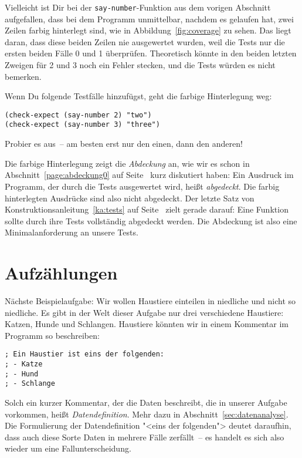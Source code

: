 Vielleicht ist Dir bei der \lstinline{say-number}-Funktion aus dem
vorigen Abschnitt aufgefallen, dass bei dem Programm unmittelbar, nachdem
es gelaufen hat, zwei Zeilen farbig
hinterlegt sind, wie in Abbildung~\ref{fig:coverage} zu sehen.  Das liegt
daran, dass diese beiden Zeilen nie ausgewertet wurden, weil die
Tests nur die ersten beiden Fälle 0 und 1 überprüfen.  Theoretisch
könnte in den beiden letzten Zweigen für 2 und 3 noch ein Fehler
stecken, und die Tests würden es nicht bemerken.

Wenn Du folgende Testfälle hinzufügst, geht die farbige Hinterlegung weg:
%
\begin{lstlisting}
(check-expect (say-number 2) "two")
(check-expect (say-number 3) "three")
\end{lstlisting}
%
Probier es aus~-- am besten erst nur den einen, dann den anderen!

Die farbige Hinterlegung zeigt die \textit{Abdeckung} an, wie wir es
schon in Abschnitt~\ref{page:abdeckung0} auf
Seite~\pageref{page:abdeckung0} kurz diskutiert haben: Ein Ausdruck im
Programm, der durch die Tests ausgewertet wird, heißt
\textit{abgedeckt}.  Die farbig hinterlegten Ausdrücke sind also nicht
abgedeckt.  Der letzte Satz von Konstruktionsanleitung~\ref{ka:tests}
auf Seite~\pageref{ka:tests} zielt gerade darauf: Eine Funktion sollte
durch ihre Tests vollständig abgedeckt werden.  Die Abdeckung ist also
eine Minimalanforderung an unsere Tests.

\section{Aufzählungen}

Nächste Beispielaufgabe: Wir wollen Haustiere einteilen in niedliche
und nicht so niedliche.  Es gibt in der Welt dieser Aufgabe nur drei
verschiedene Haustiere: Katzen, Hunde und Schlangen.  Haustiere
könnten wir in einem Kommentar im Programm so beschreiben:
%
\label{sec:datendefinition}
\begin{lstlisting}
; Ein Haustier ist eins der folgenden:
; - Katze
; - Hund
; - Schlange
\end{lstlisting}
%
Solch ein kurzer Kommentar, der die Daten beschreibt, die in unserer
Aufgabe vorkommen, heißt
\textit{Datendefinition}.  Mehr dazu in
Abschnitt~\ref{sec:datenanalyse}.  Die Formulierung der
Datendefinition "<eins der folgenden"> deutet daraufhin, dass auch
diese Sorte Daten in mehrere Fälle zerfällt~-- es handelt es sich also
wieder um eine Fallunterscheidung.

